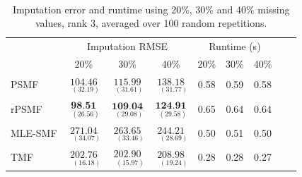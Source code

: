 \documentclass{mldsmsc}
\begin{document}
\begin{table}[H]
\centering
{} \\[0.5ex]
\begin{tabular}{@{}lccc|ccccc@{}}
\toprule
 & \multicolumn{3}{c}{Imputation RMSE} & \multicolumn{3}{c}{Runtime (s)} \\
 & 20\% & 30\% & 40\% & 20\% & 30\% & 40\% \\
\midrule
PSMF & $\underset{{\scriptscriptstyle \;\;(32.19)}}{104.46}$ & $\underset{{\scriptscriptstyle \;\;(31.61)}}{115.99}$ & $\underset{{\scriptscriptstyle \;\;\;(31.77)}}{138.18}$ & 0.58 & 0.59 & 0.58 \\
rPSMF & $\underset{{\scriptscriptstyle \;\;(26.56)}}{\textbf{98.51}}$ & $\underset{{\scriptscriptstyle \;\;(29.08)}}{\textbf{109.04}}$ & $\underset{{\scriptscriptstyle \;\;(29.58)}}{\textbf{124.91}}$ & 0.65 & 0.64 & 0.64 \\
MLE-SMF & $\underset{{\scriptscriptstyle \;\;\;(34.07)}}{271.04}$ & $\underset{{\scriptscriptstyle \;\;\;(33.46)}}{263.65}$ & $\underset{{\scriptscriptstyle \;\;\;(28.69)}}{244.21}$ & 0.50 & 0.51 & 0.50 \\
TMF & $\underset{{\scriptscriptstyle \;\;\;(16.18)}}{202.76}$ & $\underset{{\scriptscriptstyle \;\;\;(15.97)}}{202.90}$ & $\underset{{\scriptscriptstyle \;\;\;(19.24)}}{208.98}$ & 0.28 & 0.28 & 0.27 \\
\bottomrule
\end{tabular}
\caption{Imputation error and runtime using 20\%, 30\% and 40\% missing values, rank 3, averaged over 100 random repetitions.}
\label{tab:rmse3}
\end{table}
\end{document}
